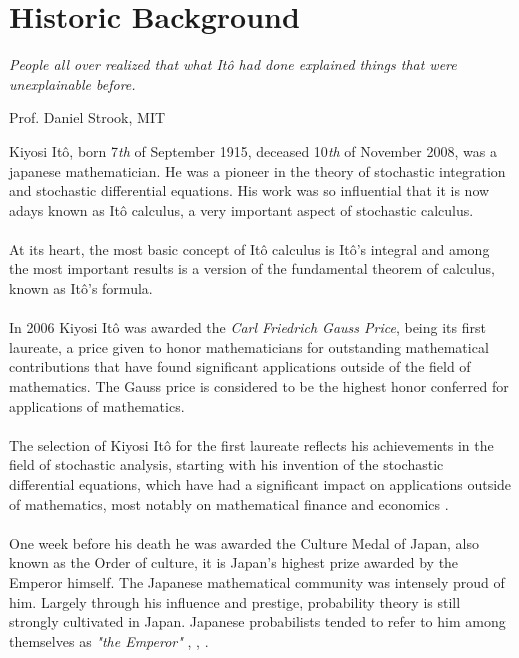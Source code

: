 \documentclass[11pt,a4paper, final]{article}
\begin{document}
\newpage
\thispagestyle{empty}
\tableofcontents
\newpage
\section{Historic Background}



\epigraph{\textit{People all over realized that what Itô had done explained things that were unexplainable before.}}{Prof. Daniel Strook, MIT}

\noindent Kiyosi Itô, born 7\textit{th} of September 1915, deceased 10\textit{th} of November 2008, was a japanese mathematician. He was a pioneer in the theory of stochastic integration and stochastic differential equations. His work was so influential that it is now adays known as Itô calculus, a very important aspect of stochastic calculus. 
\\\\
At its heart, the most basic concept of Itô calculus is Itô's integral and among the most important results is a version of the fundamental theorem of calculus, known as Itô's formula.
\\\\
In 2006 Kiyosi Itô was awarded the \textit{Carl Friedrich Gauss Price}, being its first laureate, a price given to honor mathematicians for outstanding mathematical contributions that have found significant applications outside of the field of mathematics. The Gauss price is considered to be the highest honor conferred for applications of mathematics.
\\
\\
The selection of Kiyosi Itô for the first laureate reflects his achievements in the field of stochastic analysis, starting with his invention of the stochastic differential equations, which have had a significant impact on applications outside of mathematics, most notably on mathematical finance and economics \cite{KyotoUni}.
\\\\
One week before his death he was awarded the Culture Medal of Japan, also known as the Order of culture, it is Japan's highest prize awarded by the Emperor himself. The Japanese mathematical community was intensely proud of him. Largely through his influence and prestige, probability theory is still strongly cultivated in Japan. Japanese probabilists tended to refer to him among themselves as \textit{"the Emperor"} \cite{Turnbull}, \cite{Emperor}, \cite{MacTutor}. 
\newpage 
\end{document}
